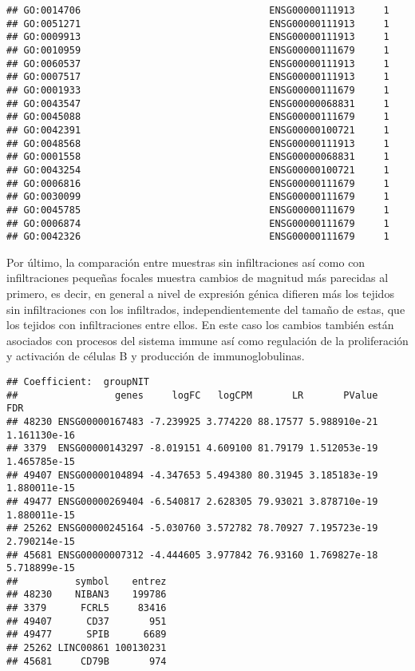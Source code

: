 \documentclass[
]{article}
\begin{document}
\begin{verbatim}
## GO:0014706                                 ENSG00000111913     1
## GO:0051271                                 ENSG00000111913     1
## GO:0009913                                 ENSG00000111913     1
## GO:0010959                                 ENSG00000111679     1
## GO:0060537                                 ENSG00000111913     1
## GO:0007517                                 ENSG00000111913     1
## GO:0001933                                 ENSG00000111679     1
## GO:0043547                                 ENSG00000068831     1
## GO:0045088                                 ENSG00000111679     1
## GO:0042391                                 ENSG00000100721     1
## GO:0048568                                 ENSG00000111913     1
## GO:0001558                                 ENSG00000068831     1
## GO:0043254                                 ENSG00000100721     1
## GO:0006816                                 ENSG00000111679     1
## GO:0030099                                 ENSG00000111679     1
## GO:0045785                                 ENSG00000111679     1
## GO:0006874                                 ENSG00000111679     1
## GO:0042326                                 ENSG00000111679     1
\end{verbatim}

Por último, la comparación entre muestras sin infiltraciones así como
con infiltraciones pequeñas focales muestra cambios de magnitud más
parecidas al primero, es decir, en general a nivel de expresión génica
difieren más los tejidos sin infiltraciones con los infiltrados,
independientemente del tamaño de estas, que los tejidos con
infiltraciones entre ellos. En este caso los cambios también están
asociados con procesos del sistema immune así como regulación de la
proliferación y activación de células B y producción de
immunoglobulinas.

\begin{verbatim}
## Coefficient:  groupNIT 
##                 genes     logFC   logCPM       LR       PValue          FDR
## 48230 ENSG00000167483 -7.239925 3.774220 88.17577 5.988910e-21 1.161130e-16
## 3379  ENSG00000143297 -8.019151 4.609100 81.79179 1.512053e-19 1.465785e-15
## 49407 ENSG00000104894 -4.347653 5.494380 80.31945 3.185183e-19 1.880011e-15
## 49477 ENSG00000269404 -6.540817 2.628305 79.93021 3.878710e-19 1.880011e-15
## 25262 ENSG00000245164 -5.030760 3.572782 78.70927 7.195723e-19 2.790214e-15
## 45681 ENSG00000007312 -4.444605 3.977842 76.93160 1.769827e-18 5.718899e-15
##          symbol    entrez
## 48230    NIBAN3    199786
## 3379      FCRL5     83416
## 49407      CD37       951
## 49477      SPIB      6689
## 25262 LINC00861 100130231
## 45681     CD79B       974
\end{verbatim}
\end{document}
